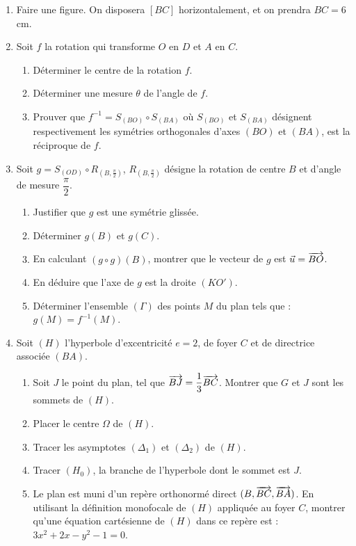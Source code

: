 \documentclass[11pt]{article}
\begin{document}
\begin{enumerate}
  \item Faire une figure. On disposera $[BC]$ horizontalement, et on prendra $BC = 6$ cm.
  \item Soit $f$ la rotation qui transforme $O$ en $D$ et $A$ en $C$.
  \begin{enumerate}[label=\alph*.]
    \item Déterminer le centre de la rotation $f$.
    \item Déterminer une mesure $\theta$ de l'angle de $f$.
    \item Prouver que $f^{-1} = S_{(BO)} \circ S_{(BA)}$ où $S_{(BO)}$ et $S_{(BA)}$ désignent respectivement les symétries orthogonales d'axes $(BO)$ et $(BA)$, est la réciproque de $f$.
  \end{enumerate}
  \item Soit $g = S_{(OD)} \circ R_{(B,\frac{\pi}{2})}$, $R_{(B,\frac{\pi}{2})}$ désigne la rotation de centre $B$ et d'angle de mesure $\dfrac{\pi}{2}$.
  \begin{enumerate}[label=\alph*.]
    \item Justifier que $g$ est une symétrie glissée.
    \item Déterminer $g(B)$ et $g(C)$.
    \item En calculant $(g \circ g)(B)$, montrer que le vecteur de $g$ est $\vec{u} = \overrightarrow{BO}$.
    \item En déduire que l'axe de $g$ est la droite $(KO')$.
    \item Déterminer l'ensemble $(\Gamma)$ des points $M$ du plan tels que : $g(M) = f^{-1}(M)$.
  \end{enumerate}
  \item Soit $(H)$ l'hyperbole d'excentricité $e = 2$, de foyer $C$ et de directrice associée $(BA)$.
  \begin{enumerate}[label=\alph*.]
    \item Soit $J$ le point du plan, tel que $\overrightarrow{BJ} = \dfrac{1}{3}\overrightarrow{BC}$. Montrer que $G$ et $J$ sont les sommets de $(H)$.
    \item Placer le centre $\Omega$ de $(H)$.
    \item Tracer les asymptotes $(\Delta_1)$ et $(\Delta_2)$ de $(H)$.
    \item Tracer $(H_0)$, la branche de l'hyperbole dont le sommet est $J$.
    \item Le plan est muni d'un repère orthonormé direct $(B,\overrightarrow{BC},\overrightarrow{BA})$. En utilisant la définition monofocale de $(H)$ appliquée au foyer $C$, montrer qu'une équation cartésienne de $(H)$ dans ce repère est : $3x^2 + 2x - y^2 - 1 = 0$.
  \end{enumerate}
\end{enumerate}
\end{document}

